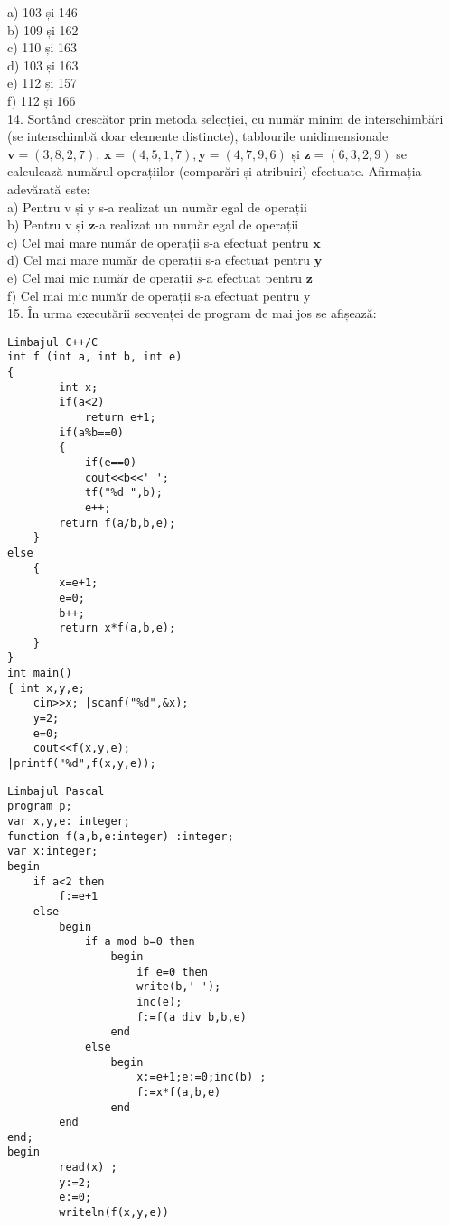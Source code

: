 a) 103 și 146\\
b) 109 și 162\\
c) 110 și 163\\
d) 103 și 163\\
e) 112 și 157\\
f) 112 și 166\\
14. Sortând crescător prin metoda selecției, cu număr minim de interschimbări (se interschimbă doar elemente distincte), tablourile unidimensionale $\mathbf{v}=(3,8,2,7)$, $\mathbf{x}=(4,5,1,7), \mathbf{y}=(4,7,9,6)$ și $\mathbf{z}=(6,3,2,9)$ se calculează numărul operațiilor (comparări și atribuiri) efectuate. Afirmația adevărată este:\\
a) Pentru v și y s-a realizat un număr egal de operații\\
b) Pentru v și $\mathbf{z}$-a realizat un număr egal de operații\\
c) Cel mai mare număr de operații s-a efectuat pentru $\mathbf{x}$\\
d) Cel mai mare număr de operații s-a efectuat pentru $\mathbf{y}$\\
e) Cel mai mic număr de operații $s$-a efectuat pentru $\mathbf{z}$\\
f) Cel mai mic număr de operații s-a efectuat pentru y\\
15. În urma executării secvenței de program de mai jos se afișează:

\begin{verbatim}
Limbajul C++/C
int f (int a, int b, int e)
{
        int x;
        if(a<2)
            return e+1;
        if(a%b==0)
        {
            if(e==0)
            cout<<b<<' ';
            tf("%d ",b);
            e++;
        return f(a/b,b,e);
    }
else
    {
        x=e+1;
        e=0;
        b++;
        return x*f(a,b,e);
    }
}
int main()
{ int x,y,e;
    cin>>x; |scanf("%d",&x);
    y=2;
    e=0;
    cout<<f(x,y,e);
|printf("%d",f(x,y,e));
\end{verbatim}

\begin{verbatim}
Limbajul Pascal
program p;
var x,y,e: integer;
function f(a,b,e:integer) :integer;
var x:integer;
begin
    if a<2 then
        f:=e+1
    else
        begin
            if a mod b=0 then
                begin
                    if e=0 then
                    write(b,' ');
                    inc(e);
                    f:=f(a div b,b,e)
                end
            else
                begin
                    x:=e+1;e:=0;inc(b) ;
                    f:=x*f(a,b,e)
                end
        end
end;
begin
        read(x) ;
        y:=2;
        e:=0;
        writeln(f(x,y,e))
\end{verbatim}

